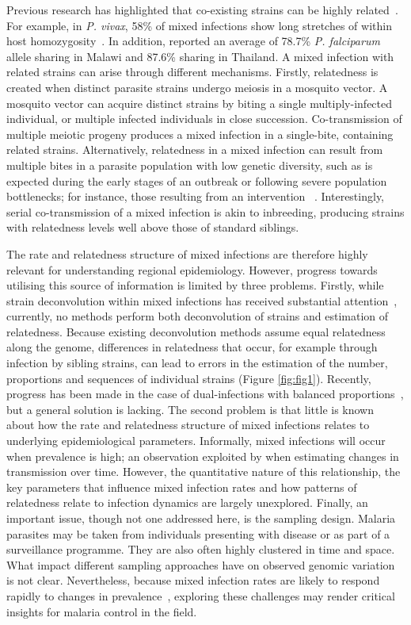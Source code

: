 \documentclass[9pt,lineno]{elife}
\begin{document}
Previous research has highlighted that co-existing strains can be highly related~\citep{Nair2014, Trevino2017}.  For example, in {\it P. vivax}, 58\% of mixed infections show long stretches of within host homozygosity~\citep{Pearson2016}. In addition, \citet{Nkhoma2012} reported an average of 78.7\% {\it P. falciparum} allele sharing in Malawi and 87.6\% sharing in Thailand. A mixed infection with related strains can arise through different mechanisms. Firstly, relatedness is created when distinct parasite strains undergo meiosis in a mosquito vector. A mosquito vector can acquire distinct strains by biting a single multiply-infected individual, or multiple infected individuals in close succession.  Co-transmission of multiple meiotic progeny produces a mixed infection in a single-bite, containing related strains.  Alternatively, relatedness in a mixed infection can result from multiple bites in a parasite population with low genetic diversity, such as is expected during the early stages of an outbreak or following severe population bottlenecks; for instance, those resulting from an intervention ~\citep{Mouzin2010, Wong2017, Daniels2015}. Interestingly, serial co-transmission of a mixed infection is akin to inbreeding, producing strains with relatedness levels well above those of standard siblings.

The rate and relatedness structure of mixed infections are therefore highly relevant for understanding regional epidemiology.  However, progress towards utilising this source of information is limited by three problems.  Firstly, while strain deconvolution within mixed infections has received substantial attention~\citep{Galinsky2015, Jack2016, Chang2017, Zhu2017}, currently, no methods perform both deconvolution of strains and estimation of relatedness.  Because existing deconvolution methods assume equal relatedness along the genome, differences in relatedness that occur, for example through infection by sibling strains, can lead to errors in the estimation of the number, proportions and sequences of individual strains (Figure \ref{fig:fig1}).  Recently, progress has been made in the case of dual-infections with balanced proportions~\citep{Henden2016}, but a general solution is lacking.  The second problem is that little is known about how the rate and relatedness structure of mixed infections relates to underlying epidemiological parameters.  Informally, mixed infections will occur when prevalence is high; an observation exploited by \citet{Cerqueira2017} when estimating changes in transmission over time.  However, the quantitative nature of this relationship, the key parameters that influence mixed infection rates and how patterns of relatedness relate to infection dynamics are largely unexplored.  Finally, an important issue, though not one addressed here, is the sampling design.  Malaria parasites may be taken from individuals presenting with disease or as part of a surveillance programme.  They are also often highly clustered in time and space.  What impact different sampling approaches have on observed genomic variation is not clear.  Nevertheless, because mixed infection rates are likely to respond rapidly to changes in prevalence~\citep{volkman2012}, exploring these challenges may render critical insights for malaria control in the field.
\end{document}
